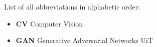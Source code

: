 
List of all abbreviations in alphabetic order:

\begin{itemize}
    ML machine learning 
    AI artificial intelligence 
    \item \textbf{CV} Computer Vision
    \item \textbf{GAN} Generative Adversarial Networks
   UiT
   
    

    
\end{itemize}